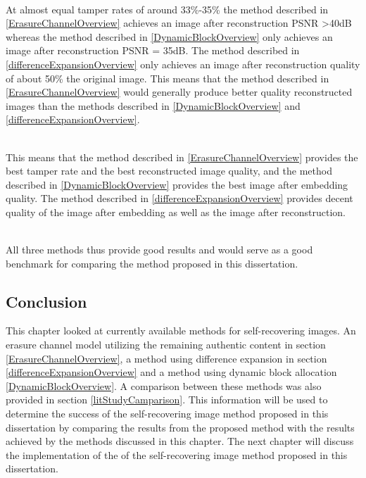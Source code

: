 \documentclass[12pt]{article}
\begin{document}
\hspace{0pt} \\
At almost equal tamper rates of around 33\%-35\% the method described in \ref{ErasureChannelOverview} achieves an image after reconstruction PSNR \textgreater 40dB whereas the method described in \ref{DynamicBlockOverview} only achieves an image after reconstruction PSNR = 35dB.
The method described in \ref{differenceExpansionOverview} only achieves an image after reconstruction quality of about 50\% the original image.
This means that the method described in \ref{ErasureChannelOverview} would generally produce better quality reconstructed images than the methods described in \ref{DynamicBlockOverview} and \ref{differenceExpansionOverview}.

\hspace{0pt} \\
This means that the method described in \ref{ErasureChannelOverview} provides the best tamper rate and the best reconstructed image quality, and the method described in \ref{DynamicBlockOverview} provides the best image after embedding quality.
The method described in \ref{differenceExpansionOverview} provides decent quality of the image after embedding as well as the image after reconstruction.

\hspace{0pt} \\
All three methods thus provide good results and would serve as a good benchmark for comparing the method proposed in this dissertation.

\subsection{Conclusion}
This chapter looked at currently available methods for self-recovering images.
An erasure channel model utilizing the remaining authentic content in section \ref{ErasureChannelOverview}, a method using difference expansion in section \ref{differenceExpansionOverview} and a method using dynamic block allocation \ref{DynamicBlockOverview}.
A comparison between these methods was also provided in section \ref{litStudyCamparison}.
This information will be used to determine the success of the self-recovering image method proposed in this dissertation by comparing the results from the proposed method with the results achieved by the methods discussed in this chapter.
The next chapter will discuss the implementation of the of the self-recovering image method proposed in this dissertation.  
\end{document}
